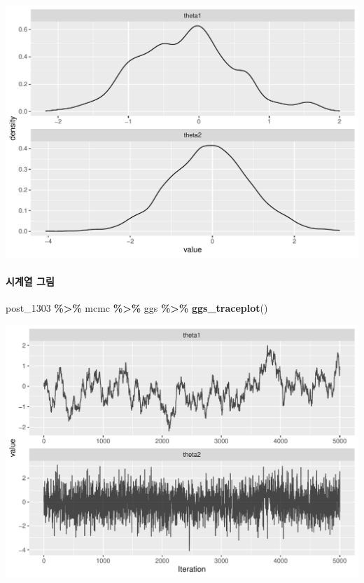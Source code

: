 \documentclass[
]{article}
\newenvironment{Shaded}{\begin{snugshade}}{\end{snugshade}}
\newcommand{\FunctionTok}[1]{\textcolor[rgb]{0.13,0.29,0.53}{\textbf{#1}}}
\newcommand{\NormalTok}[1]{#1}
\newcommand{\SpecialCharTok}[1]{\textcolor[rgb]{0.81,0.36,0.00}{\textbf{#1}}}
\begin{document}
\begin{center}\includegraphics[width=0.8\linewidth]{Bayes_stat_hw3_files/figure-latex/unnamed-chunk-24-2} \end{center}

\paragraph{시계열 그림}\label{uxc2dcuxacc4uxc5f4-uxadf8uxb9bc-3}

\begin{Shaded}
\begin{Highlighting}[]
\NormalTok{post\_1303 }\SpecialCharTok{\%\textgreater{}\%}\NormalTok{ mcmc }\SpecialCharTok{\%\textgreater{}\%}\NormalTok{ ggs }\SpecialCharTok{\%\textgreater{}\%} \FunctionTok{ggs\_traceplot}\NormalTok{()}
\end{Highlighting}
\end{Shaded}

\begin{center}\includegraphics[width=0.8\linewidth]{Bayes_stat_hw3_files/figure-latex/unnamed-chunk-25-1} \end{center}
\end{document}
